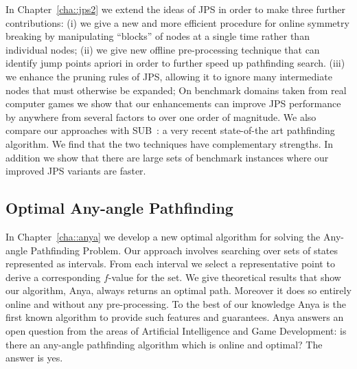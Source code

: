 In Chapter~\ref{cha::jps2} we extend the ideas of JPS in order to make three
further contributions: (i) we give a new and more efficient procedure for
online symmetry breaking by manipulating ``blocks'' of nodes at a single time
rather than individual nodes; (ii) we give new offline pre-processing
technique that can identify jump points apriori in order to further speed up
pathfinding search.  (iii) we enhance the pruning rules of JPS, allowing it to
ignore many intermediate nodes that must otherwise be expanded; On benchmark
domains taken from real computer games we show that our enhancements can
improve JPS performance by anywhere from several factors to over one order of
magnitude. We also compare our approaches with SUB~\citep{urasKH13}: a very
recent state-of-the art pathfinding algorithm. We find that the two techniques
have complementary strengths. In addition we show that there are large sets of
benchmark instances where our improved JPS variants are faster.

\subsection{Optimal Any-angle Pathfinding}
\label{cha::intro::contributions::anya}
In Chapter~\ref{cha::anya} we develop a new optimal algorithm for solving the
Any-angle Pathfinding Problem.  Our approach involves searching over sets of
states represented as intervals. From each interval we select a representative
point to derive a corresponding $f$-value for the set.  We give theoretical
results that show our algorithm, Anya, always returns an optimal path.
Moreover it does so entirely online and without any pre-processing. To the
best of our knowledge Anya is the first known algorithm to provide such
features and guarantees.  Anya answers an open question from the areas of
Artificial Intelligence and Game Development: is there an any-angle
pathfinding algorithm which is online and optimal?  The answer is yes.

